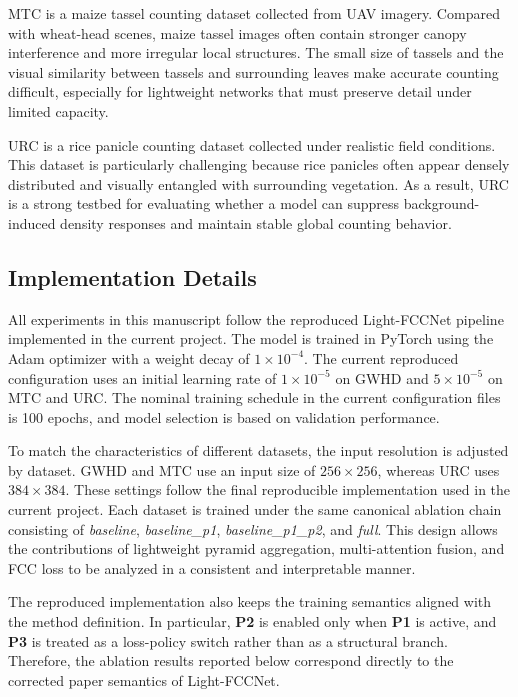 \documentclass[a4paper,fleqn]{cas-sc}
\begin{document}
MTC is a maize tassel counting dataset collected from UAV imagery. Compared with wheat-head scenes, maize tassel images often contain stronger canopy interference and more irregular local structures. The small size of tassels and the visual similarity between tassels and surrounding leaves make accurate counting difficult, especially for lightweight networks that must preserve detail under limited capacity.

URC is a rice panicle counting dataset collected under realistic field conditions. This dataset is particularly challenging because rice panicles often appear densely distributed and visually entangled with surrounding vegetation. As a result, URC is a strong testbed for evaluating whether a model can suppress background-induced density responses and maintain stable global counting behavior.

\subsection{Implementation Details}

All experiments in this manuscript follow the reproduced Light-FCCNet pipeline implemented in the current project. The model is trained in PyTorch using the Adam optimizer with a weight decay of $1\times10^{-4}$. The current reproduced configuration uses an initial learning rate of $1\times10^{-5}$ on GWHD and $5\times10^{-5}$ on MTC and URC. The nominal training schedule in the current configuration files is 100 epochs, and model selection is based on validation performance.

To match the characteristics of different datasets, the input resolution is adjusted by dataset. GWHD and MTC use an input size of $256 \times 256$, whereas URC uses $384 \times 384$. These settings follow the final reproducible implementation used in the current project. Each dataset is trained under the same canonical ablation chain consisting of \textit{baseline}, \textit{baseline\_p1}, \textit{baseline\_p1\_p2}, and \textit{full}. This design allows the contributions of lightweight pyramid aggregation, multi-attention fusion, and FCC loss to be analyzed in a consistent and interpretable manner.

The reproduced implementation also keeps the training semantics aligned with the method definition. In particular, \textbf{P2} is enabled only when \textbf{P1} is active, and \textbf{P3} is treated as a loss-policy switch rather than as a structural branch. Therefore, the ablation results reported below correspond directly to the corrected paper semantics of Light-FCCNet.
\end{document}
